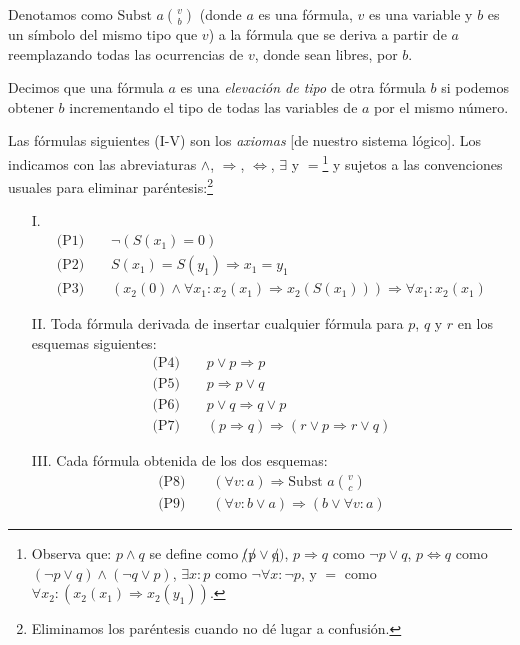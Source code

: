 \begin{sistemalogico}
Denotamos como $\text{Subst } a\binom{v}{b}$ (donde $a$ es una fórmula, $v$ es una variable y $b$ es un símbolo del mismo tipo que $v$) a la fórmula que se deriva a partir de $a$ reemplazando todas las ocurrencias de $v$, donde sean libres, por $b$.

Decimos que una fórmula $a$ es una \emph{elevación de tipo} de otra fórmula $b$ si podemos obtener $b$ incrementando el tipo de todas las variables de $a$ por el mismo número.

Las fórmulas siguientes (I-V) son los \emph{axiomas} [de nuestro sistema lógico]. Los indicamos con las abreviaturas $\wedge$, $\Rightarrow$, $\iff$, $\exists$ y $=$\footnote{Observa que: $p\wedge q$ se define como $\not(\not p \vee \not q)$, $p\Rightarrow q$ como $\neg p \vee q$, $p \iff q$ como $(\neg p \vee q) \wedge (\neg q \vee p)$, $\exists x : p$ como $\neg\forall x: \neg p$, y $=$ como $\forall x_2 : (x_2(x_1) \Rightarrow x_2(y_1))$.} y sujetos a las convenciones usuales para eliminar paréntesis:\footnote{Eliminamos los paréntesis cuando no dé lugar a confusión.}
\begin{itemize}
    \item[I.] \begin{align*}
        \text{(P1)} &\;\;\;\; \neg(S(x_1)=0) \\
        \text{(P2)} &\;\;\;\; S(x_1)=S(y_1) \Rightarrow x_1=y_1 \\
        \text{(P3)} &\;\;\;\; \left(x_2(0)\wedge\forall x_1 : x_2(x_1) \Rightarrow x_2(S(x_1))\right) \Rightarrow \forall x_1 : x_2(x_1)
    \end{align*}
    \item[II.] Toda fórmula derivada de insertar cualquier fórmula para $p$, $q$ y $r$ en los esquemas siguientes:
    \begin{align}
        \text{(P4)} &\;\;\;\; p \vee p \Rightarrow p \\
        \text{(P5)} &\;\;\;\; p \Rightarrow p \vee q \\
        \text{(P6)} &\;\;\;\; p \vee q \Rightarrow q \vee p \\
        \text{(P7)} &\;\;\;\; (p \Rightarrow q) \Rightarrow (r \vee p \Rightarrow r \vee q)
    \end{align}
    \item[III.] Cada fórmula obtenida de los dos esquemas:
    \begin{align}
        \text{(P8)} &\;\;\;\; (\forall v : a) \Rightarrow \text{Subst } a\binom{v}{c} \\
        \text{(P9)} &\;\;\;\; (\forall v : b \vee a) \Rightarrow (b \vee \forall v : a)
    \end{align}


\end{itemize}
\end{sistemalogico}
